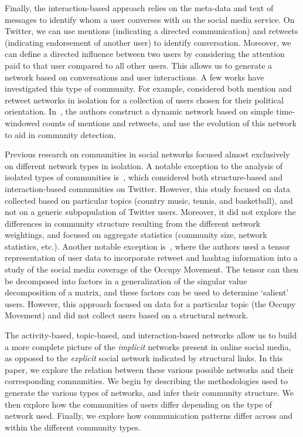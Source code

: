Finally, the interaction-based approach relies on the meta-data and text of messages to identify whom a user converses with on the social media service. On Twitter, we can use mentions (indicating a directed communication) and retweets (indicating endorsement of another user) to identify conversation. Moreover, we can define a directed influence between two users by considering the attention paid to that user compared to all other users. This allows us to generate a network based on conversations and user interactions.
A few works have investigated this type of community. For example, \cite{conover2011political} considered both mention and retweet networks in isolation for a collection of users chosen for their political orientation. In~\cite{deitrick2013mutually}, the authors construct a dynamic network based on simple time-windowed counts of mentions and retweets, and use the evolution of this network to aid in community detection.

Previous research on communities in social networks focused almost exclusively on different network types in isolation.
A notable exception to the analysis of isolated types of communities is~\cite{lim2012tweets}, which considered both structure-based and interaction-based communities on Twitter. However, this study focused on data collected based on particular topics (country music, tennis, and basketball), and not on a generic subpopulation of Twitter users. Moreover, it did not explore the differences in community structure resulting from the different network weightings, and focused on aggregate statistics (community size, network statistics, etc.). Another notable exception is~\cite{kao2013talison}, where the authors used a tensor representation of user data to incorporate retweet and hashtag information into a study of the social media coverage of the Occupy Movement. The tensor can then be decomposed into factors in a generalization of the singular value decomposition of a matrix, and these factors can be used to determine `salient' users. However, this approach focused on data for a particular topic (the Occupy Movement) and did not collect users based on a structural network.

The activity-based, topic-based, and interaction-based networks allow us to build a more complete picture of the \emph{implicit} networks present in online social media, as opposed to the \emph{explicit} social network indicated by structural links. In this paper, we explore the relation between these various possible networks and their corresponding communities. We begin by describing the methodologies used to generate the various types of networks, and infer their community structure. We then explore how the communities of users differ depending on the type of network used. Finally, we explore how communication patterns differ across and within the different community types.

